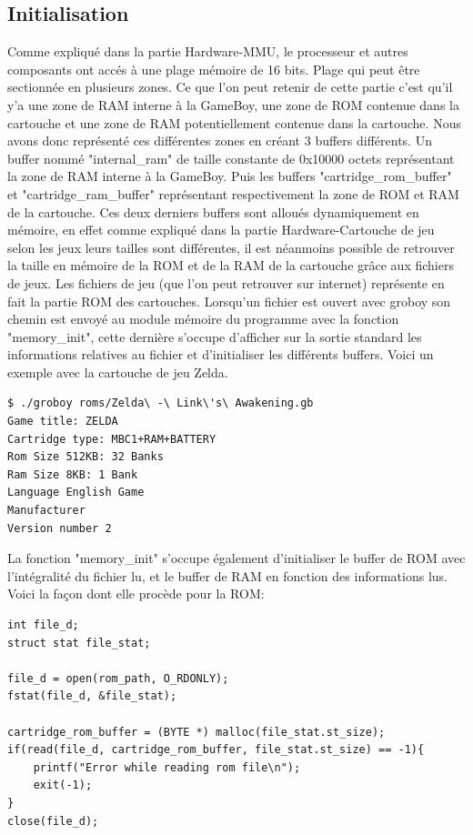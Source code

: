 \documentclass{report}
\begin{document}
\subsection{Initialisation} 
Comme expliqué dans la partie Hardware-MMU, le processeur et autres composants ont accés à une plage mémoire de 16 bits. Plage qui peut être sectionnée en plusieurs zones. Ce que l'on peut retenir de cette partie c'est qu'il y'a une zone de RAM interne à la GameBoy, une zone de ROM contenue dans la cartouche et une zone de RAM potentiellement contenue dans la cartouche. Nous avons donc représenté ces différentes zones en créant 3 buffers différents. Un buffer nommé "internal\_ram" de taille constante de 0x10000 octets représentant la zone de RAM interne à la GameBoy. Puis les buffers "cartridge\_rom\_buffer" et "cartridge\_ram\_buffer" représentant respectivement la zone de ROM et RAM de la cartouche.
Ces deux derniers buffers sont alloués dynamiquement en mémoire, en effet comme expliqué dans la partie Hardware-Cartouche de jeu selon les jeux leurs tailles sont différentes, il est néanmoins possible de retrouver la taille en mémoire de la ROM et de la RAM de la cartouche grâce aux fichiers de jeux.
Les fichiers de jeu (que l'on peut retrouver sur internet) représente en fait la partie ROM des cartouches.
Lorsqu'un fichier est ouvert avec groboy son chemin est envoyé au module mémoire du programme avec la fonction "memory\_init", cette dernière s'occupe d'afficher sur la sortie standard les informations relatives au fichier et d'initialiser les différents buffers. Voici un exemple avec la cartouche de jeu Zelda.
\begin{lstlisting}
$ ./groboy roms/Zelda\ -\ Link\'s\ Awakening.gb
Game title: ZELDA
Cartridge type: MBC1+RAM+BATTERY
Rom Size 512KB: 32 Banks
Ram Size 8KB: 1 Bank
Language English Game
Manufacturer
Version number 2
\end{lstlisting}
La fonction "memory\_init" s'occupe également d'initialiser le buffer de ROM avec l'intégralité du fichier lu, et le buffer de RAM en fonction des informations lus.
Voici la façon dont elle procède pour la ROM:
\begin{lstlisting}
int file_d;
struct stat file_stat;

file_d = open(rom_path, O_RDONLY);
fstat(file_d, &file_stat);

cartridge_rom_buffer = (BYTE *) malloc(file_stat.st_size);
if(read(file_d, cartridge_rom_buffer, file_stat.st_size) == -1){
	printf("Error while reading rom file\n");
	exit(-1);
}    
close(file_d);
\end{lstlisting}
\end{document}
